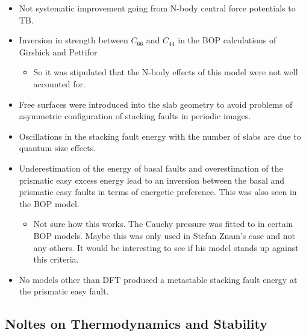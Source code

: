 \documentclass[11pt]{article}
\begin{document}
\begin{enumerate}
\begin{enumerate}
\begin{itemize}
\item Not systematic improvement going from N-body central force potentials
to TB.
\item Inversion in strength between \(C_{66}\) and \(C_{44}\) in the BOP
calculations of Girshick and Pettifor
\begin{itemize}
\item So it was stipulated that the N-body effects of this model were not
well accounted for.
\end{itemize}
\item Free surfaces were introduced into the slab geometry to avoid problems
of asymmetric configuration of stacking faults in periodic images.
\item Oscillations in the stacking fault energy with the number of slabs are
due to quantum size effects.
\item Underestimation of the energy of basal faults and overestimation of the
prismatic easy excess energy lead to an inversion between the basal and
prismatic easy faults in terms of energetic preference. This was also
seen in the BOP model.  
\begin{itemize}
\item Not sure how this works. The Cauchy pressure was fitted to in certain
BOP models. Maybe this was only used in Stefan Znam's case and not
any others. It would be interesting to see if his model stands up
against this criteria.
\end{itemize}
\item No models other than DFT produced a metastable stacking fault energy at
the prismatic easy fault.
\end{itemize}
\end{enumerate}
\end{enumerate}
\subsection{Noltes on Thermodynamics and Stability}
\label{sec:orgc4edc6e}
\end{document}
